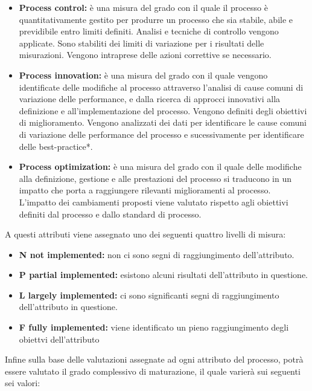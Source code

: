 \begin{itemize}
	\item \textbf{Process control:} è una misura del grado con il quale il processo è quantitativamente gestito per produrre un processo che sia stabile, abile e previdibile entro limiti definiti. Analisi e tecniche di controllo vengono applicate. Sono stabiliti dei limiti di variazione per i risultati delle misurazioni. Vengono intraprese delle azioni correttive se necessario. 
	\item \textbf{Process innovation:} è una misura del grado con il quale vengono identificate delle modifiche al processo attraverso l'analisi di cause comuni di variazione delle performance, e dalla ricerca di approcci innovativi alla definizione e all'implementazione del processo. Vengono definiti degli obiettivi di miglioramento. Vengono analizzati dei dati per identificare le cause comuni di variazione delle performance del processo e sucessivamente per identificare delle best-practice*.
	\item \textbf{Process optimization:} è una misura del grado con il quale delle modifiche alla definizione, gestione e alle prestazioni del processo si traducono in un impatto che porta a raggiungere rilevanti miglioramenti al processo. L'impatto dei cambiamenti proposti viene valutato rispetto agli obiettivi definiti dal processo e dallo standard di processo.
	\end{itemize}
	A questi attributi viene assegnato uno dei seguenti quattro livelli di misura:
	\begin{itemize}
	\item \textbf{N not implemented:} non ci sono segni di raggiungimento dell'attributo.
	\item \textbf{P partial implemented:} esistono alcuni risultati dell'attributo in questione.
	\item \textbf{L largely implemented:} ci sono significanti segni di raggiungimento dell'attributo in questione.
	\item \textbf{F fully implemented:} viene identificato un pieno raggiungimento degli obiettvi dell'attributo
	\end{itemize}
	Infine sulla base delle valutazioni assegnate ad ogni attributo del processo, potrà essere valutato il grado complessivo di maturazione, il quale varierà sui seguenti sei valori:

